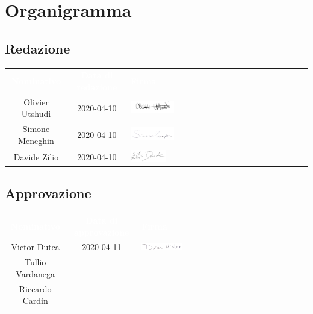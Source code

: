 \section{Organigramma}
\subsection{Redazione} 
\begin{table}[H]
	\begin{center}
	\begin{tabular}{ c c C{6.6cm} }
		\textcolor{white}{\textbf{Nominativo}} & \textcolor{white}{\textbf{Data di redazione}} & \textcolor{white}{\textbf{Firma}} \\
		Olivier Utshudi & 2020-04-10 & \includegraphics[scale=0.3, width=0.25\textwidth]{img/firme/outshudi.png}\\
		Simone Meneghin & 2020-04-10 & \includegraphics[scale=0.3, width=0.25\textwidth]{img/firme/meneghin.png}\\
		Davide Zilio & 2020-04-10 & \includegraphics[scale=0.2, width=0.2\textwidth]{img/firme/zilio.png}\\
	\end{tabular}
	\end{center}	
\end{table}

\subsection{Approvazione} 
\begin{table}[H]
	\begin{center}
	\begin{tabular}{ c c C{6cm} }
		\textcolor{white}{\textbf{Nominativo}} & \textcolor{white}{\textbf{Data di approvazione}} & \textcolor{white}{\textbf{Firma}} \\
		Victor Dutca & 2020-04-11 &  \includegraphics[scale=0.3, width=0.25\textwidth]{img/firme/dutca.png} \\
		Tullio Vardanega &  & \\
		Riccardo Cardin &  & \\
	\end{tabular}
	\end{center}	
\end{table}

